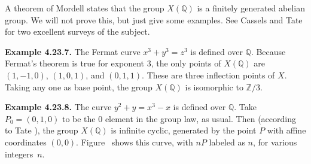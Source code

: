 {A theorem of Mordell states that the group $X(\mathbb Q)$ is a finitely generated abelian group. We will not prove this, but just give some examples. See Cassels  and Tate  for two excellent surveys of the subject.

\medskip
\noindent\hypertarget{result-IV-4.23.7}{}\textbf{Example 4.23.7.} The Fermat curve $x^3+y^3=z^3$ is defined over $\mathbb Q$. Because Fermat's theorem is true for exponent $3$, the only points of $X(\mathbb Q)$ are $(1,-1,0)$, $(1,0,1)$, and $(0,1,1)$. These are three inflection points of $X$. Taking any one as base point, the group $X(\mathbb Q)$ is isomorphic to $\mathbb Z/3$.

\medskip
\noindent\hypertarget{result-IV-4.23.8}{}\textbf{Example 4.23.8.} The curve $y^2+y=x^3-x$ is defined over $\mathbb Q$. Take $P_0=(0,1,0)$ to be the $0$ element in the group law, as usual. Then (according to Tate ), the group $X(\mathbb Q)$ is infinite cyclic, generated by the point $P$ with affine coordinates $(0,0)$. Figure~ shows this curve, with $nP$ labeled as $n$, for various integers~$n$.}
